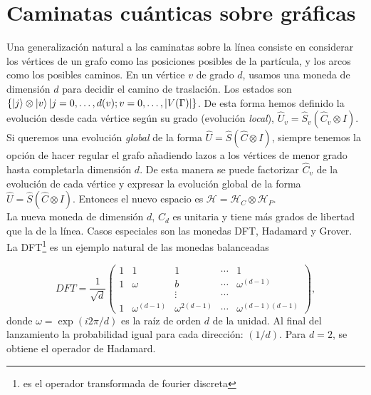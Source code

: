 \chapter{Caminatas cuánticas sobre gráficas}
Una generalización natural a las caminatas sobre la línea consiste en considerar los vértices de un grafo como las posiciones posibles de la partícula, y los arcos como los posibles caminos. En un vértice $v$ de grado $d$, usamos una moneda de dimensión $d$ para decidir el  camino de traslación. Los estados son $\left\{\ket{j}\otimes\ket{v}|j=0,\dots,d(v);v=0,\dots,|V(\Gamma)| \right\}$. De esta forma hemos definido la evolución desde cada vértice según su grado (evolución \textit{local}), $\hat{U}_v=\hat{S}_v(\hat{C}_v\otimes I)$. Si queremos una evolución \textit{global} de la forma $\hat{U}=\hat{S}(\hat{C}\otimes I)$, siempre tenemos la opción de hacer regular el grafo añadiendo lazos a los vértices de menor grado hasta completarla dimensión $d$. De esta manera se puede factorizar $\hat{C}_v$ de la evolución de cada vértice y expresar la evolución global de la forma $\hat{U}=\hat{S}(\hat{C}\otimes I)$. Entonces el nuevo espacio es $\mathcal{H}=\mathcal{H}_C\otimes\mathcal{H}_P$.\\

La nueva moneda de dimensión $d$, $C_d$ es unitaria y tiene más grados de libertad que la de la línea. Casos especiales son las monedas DFT, Hadamard y Grover. La DFT\footnote{es el operador transformada de fourier discreta} es un ejemplo natural de las monedas balanceadas

\begin{equation*}
DFT=\frac{1}{\sqrt{d}}
\begin{pmatrix}
1 & 1 & 1 & \cdots & 1\\
1 & \omega & b & \cdots & \omega^{(d-1)}\\
 &  &\vdots & \cdots & \\
1 & \omega^{(d-1)}  & \omega^{2(d-1)} & \cdots & \omega^{(d-1)(d-1)}
\end{pmatrix},
\end{equation*}{}
donde $\omega=\exp{(i2\pi/d)}$ es la raíz de orden $d$ de la unidad. Al final del lanzamiento la probabilidad igual para cada dirección: $(1/d)$. Para $d=2$, se obtiene el operador de Hadamard.\\


